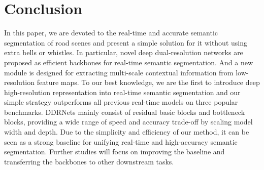\documentclass[journal]{IEEEtran}
\begin{document}
\section{Conclusion}
In this paper, we are devoted to the real-time and accurate semantic segmentation of road scenes and present a simple solution for it without using extra bells or whistles. In particular, novel deep dual-resolution networks are proposed as efficient backbones for real-time semantic segmentation. And a new module is designed for extracting multi-scale contextual information from low-resolution feature maps. To our best knowledge, we are the first to introduce deep high-resolution representation into real-time semantic segmentation and our simple strategy outperforms all previous real-time models on three popular benchmarks. DDRNets mainly consist of residual basic blocks and bottleneck blocks, providing a wide range of speed and accuracy trade-off by scaling model width and depth. Due to the simplicity and efficiency of our method, it can be seen as a strong baseline for unifying real-time and high-accuracy semantic segmentation. Further studies will focus on improving the baseline and transferring the backbones to other downstream tasks.







\end{document}
